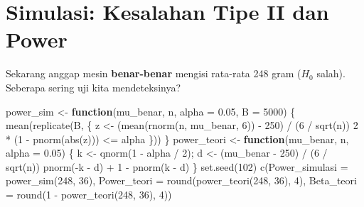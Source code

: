 \documentclass[
  indonesian,
  letterpaper,
]{book}
\newenvironment{Shaded}{\begin{snugshade}}{\end{snugshade}}
\newcommand{\AttributeTok}[1]{\textcolor[rgb]{0.40,0.45,0.13}{#1}}
\newcommand{\ControlFlowTok}[1]{\textcolor[rgb]{0.00,0.23,0.31}{\textbf{#1}}}
\newcommand{\DecValTok}[1]{\textcolor[rgb]{0.68,0.00,0.00}{#1}}
\newcommand{\FloatTok}[1]{\textcolor[rgb]{0.68,0.00,0.00}{#1}}
\newcommand{\FunctionTok}[1]{\textcolor[rgb]{0.28,0.35,0.67}{#1}}
\newcommand{\NormalTok}[1]{\textcolor[rgb]{0.00,0.23,0.31}{#1}}
\newcommand{\OtherTok}[1]{\textcolor[rgb]{0.00,0.23,0.31}{#1}}
\newcommand{\SpecialCharTok}[1]{\textcolor[rgb]{0.37,0.37,0.37}{#1}}
\begin{document}
\section{Simulasi: Kesalahan Tipe II dan
Power}\label{simulasi-kesalahan-tipe-ii-dan-power}

Sekarang anggap mesin \textbf{benar-benar} mengisi rata-rata 248 gram
(\(H_0\) salah). Seberapa sering uji kita mendeteksinya?

\begin{Shaded}
\begin{Highlighting}[]
\NormalTok{power\_sim }\OtherTok{\textless{}{-}} \ControlFlowTok{function}\NormalTok{(mu\_benar, n, }\AttributeTok{alpha =} \FloatTok{0.05}\NormalTok{, }\AttributeTok{B =} \DecValTok{5000}\NormalTok{) \{}
  \FunctionTok{mean}\NormalTok{(}\FunctionTok{replicate}\NormalTok{(B, \{}
\NormalTok{    z }\OtherTok{\textless{}{-}}\NormalTok{ (}\FunctionTok{mean}\NormalTok{(}\FunctionTok{rnorm}\NormalTok{(n, mu\_benar, }\DecValTok{6}\NormalTok{)) }\SpecialCharTok{{-}} \DecValTok{250}\NormalTok{) }\SpecialCharTok{/}\NormalTok{ (}\DecValTok{6} \SpecialCharTok{/} \FunctionTok{sqrt}\NormalTok{(n))}
    \DecValTok{2} \SpecialCharTok{*}\NormalTok{ (}\DecValTok{1} \SpecialCharTok{{-}} \FunctionTok{pnorm}\NormalTok{(}\FunctionTok{abs}\NormalTok{(z))) }\SpecialCharTok{\textless{}=}\NormalTok{ alpha}
\NormalTok{  \}))}
\NormalTok{\}}
\NormalTok{power\_teori }\OtherTok{\textless{}{-}} \ControlFlowTok{function}\NormalTok{(mu\_benar, n, }\AttributeTok{alpha =} \FloatTok{0.05}\NormalTok{) \{}
\NormalTok{  k }\OtherTok{\textless{}{-}} \FunctionTok{qnorm}\NormalTok{(}\DecValTok{1} \SpecialCharTok{{-}}\NormalTok{ alpha }\SpecialCharTok{/} \DecValTok{2}\NormalTok{); d }\OtherTok{\textless{}{-}}\NormalTok{ (mu\_benar }\SpecialCharTok{{-}} \DecValTok{250}\NormalTok{) }\SpecialCharTok{/}\NormalTok{ (}\DecValTok{6} \SpecialCharTok{/} \FunctionTok{sqrt}\NormalTok{(n))}
  \FunctionTok{pnorm}\NormalTok{(}\SpecialCharTok{{-}}\NormalTok{k }\SpecialCharTok{{-}}\NormalTok{ d) }\SpecialCharTok{+} \DecValTok{1} \SpecialCharTok{{-}} \FunctionTok{pnorm}\NormalTok{(k }\SpecialCharTok{{-}}\NormalTok{ d)}
\NormalTok{\}}
\FunctionTok{set.seed}\NormalTok{(}\DecValTok{102}\NormalTok{)}
\FunctionTok{c}\NormalTok{(}\AttributeTok{Power\_simulasi =} \FunctionTok{power\_sim}\NormalTok{(}\DecValTok{248}\NormalTok{, }\DecValTok{36}\NormalTok{), }\AttributeTok{Power\_teori =} \FunctionTok{round}\NormalTok{(}\FunctionTok{power\_teori}\NormalTok{(}\DecValTok{248}\NormalTok{, }\DecValTok{36}\NormalTok{), }\DecValTok{4}\NormalTok{),}
  \AttributeTok{Beta\_teori =} \FunctionTok{round}\NormalTok{(}\DecValTok{1} \SpecialCharTok{{-}} \FunctionTok{power\_teori}\NormalTok{(}\DecValTok{248}\NormalTok{, }\DecValTok{36}\NormalTok{), }\DecValTok{4}\NormalTok{))}
\end{Highlighting}
\end{Shaded}
\end{document}
